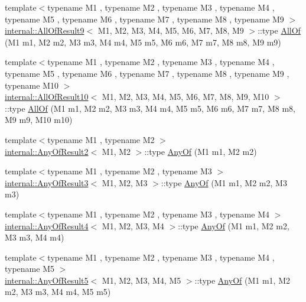 \begin{DoxyCompactItemize}
\item 
{\footnotesize template$<$typename M1 , typename M2 , typename M3 , typename M4 , typename M5 , typename M6 , typename M7 , typename M8 , typename M9 $>$ }\\\hyperlink{structtesting_1_1internal_1_1AllOfResult9}{internal\+::\+All\+Of\+Result9}$<$ M1, M2, M3, M4, M5, M6, M7, M8, M9 $>$\+::type \hyperlink{namespacetesting_aaecf2bd8eb7c68b119f9b81a01942b7f}{All\+Of} (M1 m1, M2 m2, M3 m3, M4 m4, M5 m5, M6 m6, M7 m7, M8 m8, M9 m9)
\item 
{\footnotesize template$<$typename M1 , typename M2 , typename M3 , typename M4 , typename M5 , typename M6 , typename M7 , typename M8 , typename M9 , typename M10 $>$ }\\\hyperlink{structtesting_1_1internal_1_1AllOfResult10}{internal\+::\+All\+Of\+Result10}$<$ M1, M2, M3, M4, M5, M6, M7, M8, M9, M10 $>$\+::type \hyperlink{namespacetesting_a9939c08664efeed0c1983090115f7ecb}{All\+Of} (M1 m1, M2 m2, M3 m3, M4 m4, M5 m5, M6 m6, M7 m7, M8 m8, M9 m9, M10 m10)
\item 
{\footnotesize template$<$typename M1 , typename M2 $>$ }\\\hyperlink{structtesting_1_1internal_1_1AnyOfResult2}{internal\+::\+Any\+Of\+Result2}$<$ M1, M2 $>$\+::type \hyperlink{namespacetesting_a81cfefd9f75cdce827d5bc873cf73aac}{Any\+Of} (M1 m1, M2 m2)
\item 
{\footnotesize template$<$typename M1 , typename M2 , typename M3 $>$ }\\\hyperlink{structtesting_1_1internal_1_1AnyOfResult3}{internal\+::\+Any\+Of\+Result3}$<$ M1, M2, M3 $>$\+::type \hyperlink{namespacetesting_a3ccbde3ba01189587676d44a4333c0a5}{Any\+Of} (M1 m1, M2 m2, M3 m3)
\item 
{\footnotesize template$<$typename M1 , typename M2 , typename M3 , typename M4 $>$ }\\\hyperlink{structtesting_1_1internal_1_1AnyOfResult4}{internal\+::\+Any\+Of\+Result4}$<$ M1, M2, M3, M4 $>$\+::type \hyperlink{namespacetesting_a1cfcacf2cf19543b86445e3585d5356f}{Any\+Of} (M1 m1, M2 m2, M3 m3, M4 m4)
\item 
{\footnotesize template$<$typename M1 , typename M2 , typename M3 , typename M4 , typename M5 $>$ }\\\hyperlink{structtesting_1_1internal_1_1AnyOfResult5}{internal\+::\+Any\+Of\+Result5}$<$ M1, M2, M3, M4, M5 $>$\+::type \hyperlink{namespacetesting_a049ea436e52c242adc44b2b42dc03e50}{Any\+Of} (M1 m1, M2 m2, M3 m3, M4 m4, M5 m5)
\item 

\end{DoxyCompactItemize}
